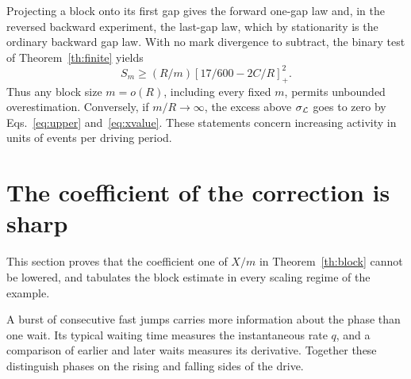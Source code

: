 \documentclass[11pt,a4paper]{article}
\newcommand{\pos}[1]{\left[#1\right]_+}
\begin{document}
Projecting a block onto its first gap gives the forward one-gap law and, in the reversed backward experiment, the last-gap law, which by stationarity is the ordinary backward gap law. With no mark divergence to subtract, the binary test of Theorem~\ref{th:finite} yields
\begin{equation}
 S_m\geq (R/m)\pos{17/600-2C/R}^2.\label{eq:short}
\end{equation}
Thus any block size $m=o(R)$, including every fixed $m$, permits unbounded overestimation. Conversely, if $m/R\to\infty$, the excess above $\sigma_{\cal L}$ goes to zero by Eqs.~\eqref{eq:upper} and~\eqref{eq:xvalue}. These statements concern increasing activity in units of events per driving period.

\section{The coefficient of the correction is sharp}\label{sec:sharp}
This section proves that the coefficient one of $X/m$ in Theorem~\ref{th:block} cannot be lowered, and tabulates the block estimate in every scaling regime of the example.

A burst of consecutive fast jumps carries more information about the phase than one wait. Its typical waiting time measures the instantaneous rate $q$, and a comparison of earlier and later waits measures its derivative. Together these distinguish phases on the rising and falling sides of the drive.
\end{document}
